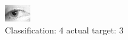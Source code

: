 \begin{figure}[h!]
\begin{center}
\includegraphics[width=0.60\columnwidth]{figures/ID1359_class_4_target_3.png}
\end{center}
\caption{ Classification: 4 actual target: 3}
\label{fig:ID1359_class_4_target_3}
\end{figure}
